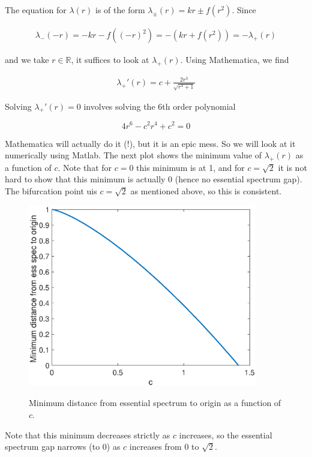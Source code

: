 \documentclass[12pt]{article}
\def\R{{\mathbb R}}
\begin{document}
The equation for $\lambda(r)$ is of the form $\lambda_\pm(r) = k r \pm f(r^2)$. Since

\begin{align*}
\lambda_-(-r) = -kr - f((-r)^2) = -(kr + f(r^2)) = -\lambda_+(r)
\end{align*} 

and we take $r \in \R$, it suffices to look at $\lambda_+(r)$. Using Mathematica, we find

\begin{align*}
\lambda_+'(r) = c+\frac{2 r^3}{\sqrt{r^4+1}}
\end{align*}

Solving $\lambda_+'(r) = 0$ involves solving the 6th order polynomial

\[
4 r^6 - c^2 r^4 + c^2 = 0
\]

Mathematica will actually do it (!), but it is an epic mess. So we will look at it numerically using Matlab. The next plot shows the minimum value of $\lambda_+(r)$ as a function of $c$. Note that for $c = 0$ this minimum is at 1, and for $c = \sqrt{2}$ it is not hard to show that this minimum is actually 0 (hence no essential spectrum gap). The bifurcation point uis $c = \sqrt{2}$ as mentioned above, so this is consistent.

\begin{figure}[H]
\centering
\includegraphics[width=10cm]{minlambdaplus.eps}
\label{fig:essspec2}
\caption{Minimum distance from essential spectrum to origin as a function of $c$.}
\end{figure}

Note that this minimum decreases strictly as $c$ increases, so the essential spectrum gap narrows (to 0) as $c$ increases from 0 to $\sqrt{2}$.\\
\end{document}
